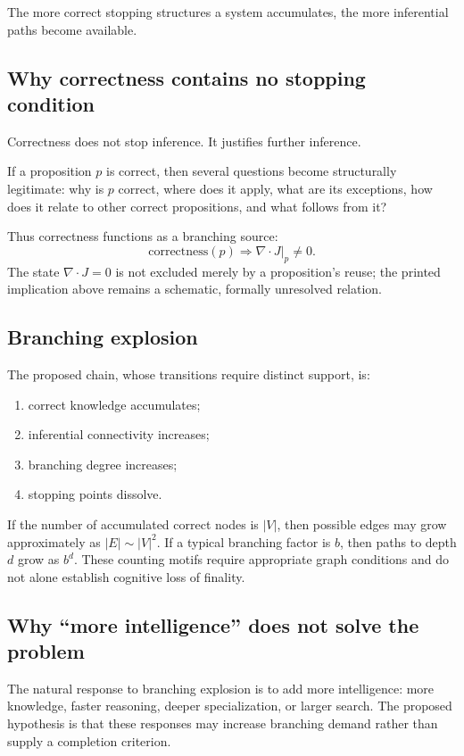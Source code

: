 The more correct stopping structures a system accumulates, the more inferential paths become available.

\subsection{Why correctness contains no stopping condition}

Correctness does not stop inference. It justifies further inference.

If a proposition \(p\) is correct, then several questions become structurally legitimate: why is \(p\) correct, where does it apply, what are its exceptions, how does it relate to other correct propositions, and what follows from it?

Thus correctness functions as a branching source:
\[
\mathrm{correctness}(p)\Rightarrow \nabla\cdot J|_p\neq 0.
\]
The state \(\nabla\cdot J=0\) is not excluded merely by a proposition's reuse; the printed implication above remains a schematic, formally unresolved relation.

\subsection{Branching explosion}

The proposed chain, whose transitions require distinct support, is:

\begin{enumerate}
\item correct knowledge accumulates;
\item inferential connectivity increases;
\item branching degree increases;
\item stopping points dissolve.
\end{enumerate}

If the number of accumulated correct nodes is \(|V|\), then possible edges may grow approximately as \(|E|\sim |V|^2\). If a typical branching factor is \(b\), then paths to depth \(d\) grow as \(b^d\). These counting motifs require appropriate graph conditions and do not alone establish cognitive loss of finality.

\subsection{Why ``more intelligence'' does not solve the problem}

The natural response to branching explosion is to add more intelligence: more knowledge, faster reasoning, deeper specialization, or larger search. The proposed hypothesis is that these responses may increase branching demand rather than supply a completion criterion.

